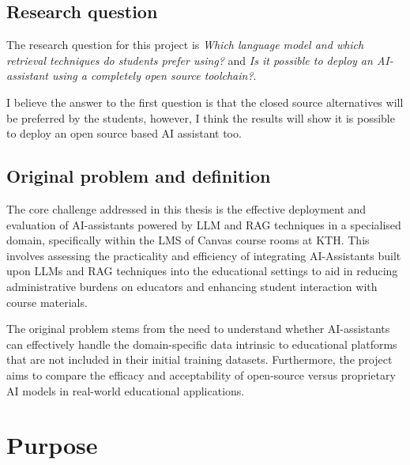 \subsection{Research question}
\label{sec:researchQuestion}


The research question for this project is \textit{Which language model and which retrieval techniques do students prefer using?} and \textit{Is it possible to deploy an AI-assistant using a completely open source toolchain?}.


I believe the answer to the first question is that the closed source alternatives will be preferred by the students, however, I think the results will show it is possible to deploy an open source based AI assistant too.


\subsection{Original problem and definition}






The core challenge addressed in this thesis is the effective deployment and evaluation of AI-assistants powered by \gls{LLM} and \gls{RAG} techniques in a specialised domain, specifically within the \gls{LMS} of Canvas course rooms at KTH. This involves assessing the practicality and efficiency of integrating AI-Assistants built upon LLMs and RAG techniques into the educational settings to aid in reducing administrative burdens on educators and enhancing student interaction with course materials.


The original problem stems from the need to understand whether AI-assistants can effectively handle the domain-specific data intrinsic to educational platforms that are not included in their initial training datasets. Furthermore, the project aims to compare the efficacy and acceptability of open-source versus proprietary AI models in real-world educational applications.


\section{Purpose}


